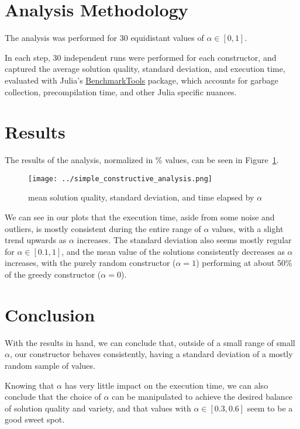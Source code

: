 \documentclass[a4paper,10pt]{article}
\begin{document}
\section{Analysis Methodology}

The analysis was performed for 30 equidistant values of $\alpha \in [0, 1]$.

In each step, 30 independent runs were performed for each constructor, and captured
the average solution quality, standard deviation, and execution time, evaluated with
Julia's \href{https://juliapackages.com/p/benchmarktools}{BenchmarkTools} package,
which accounts for garbage collection, precompilation time, and other Julia specific
nuances.

\section{Results}
The results of the analysis, normalized in \% values, can be seen in Figure~\ref{fig:results}.

\begin{figure}[!ht]
    \centering
    \texttt{[image: ../simple\_constructive\_analysis.png]}
    \caption{mean solution quality, standard deviation, and time elapsed by $\alpha$}
    \label{fig:results}
\end{figure}

We can see in our plots that the execution time, aside from some noise and outliers, is mostly 
consistent during the entire range of $\alpha$ values, with a slight trend upwards as $\alpha$
increases. The standard deviation also seems mostly regular for $\alpha \in [0.1, 1]$, and the mean
value of the solutions consistently decreases as $\alpha$ increases, with the purely random
constructor ($\alpha = 1$) performing at about 50\% of the greedy constructor ($\alpha = 0$).

\section{Conclusion}

With the results in hand, we can conclude that, outside of a small range of small $\alpha$, our
constructor behaves consistently, having a standard deviation of a mostly random sample of values.

Knowing that $\alpha$ has very little impact on the execution time, we can also conclude that
the choice of $\alpha$ can be manipulated to achieve the desired balance of solution quality
and variety, and that values with $\alpha \in [0.3, 0.6]$ seem to be a good sweet spot.
\end{document}
